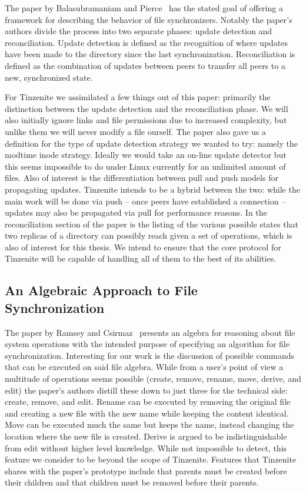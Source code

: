 The paper by Balasubramaniam and Pierce~\cite{balasubramaniam1998file} has the stated goal of offering a framework for describing the behavior of file synchronizers.
Notably the paper's authors divide the process into two separate phases: update detection and reconciliation.
Update detection is defined as the recognition of where updates have been made to the directory since the last synchronization.
Reconciliation is defined as the combination of updates between peers to transfer all peers to a new, synchronized state.

For Tinzenite we assimilated a few things out of this paper: primarily the distinction between the update detection and the reconciliation phase.
We will also initially ignore links and file permissions due to increased complexity, but unlike them we will never modify a file ourself.
The paper also gave us a definition for the type of update detection strategy we wanted to try: namely the modtime inode strategy.
Ideally we would take an on-line update detector but this seems impossible to do under Linux currently for an unlimited amount of files.
Also of interest is the differentiation between pull and push models for propagating updates.
Tinzenite intends to be a hybrid between the two: while the main work will be done via push -- once peers have established a connection -- updates may also be propagated via pull for performance reasons.
In the reconciliation section of the paper is the listing of the various possible states that two replicas of a directory can possibly reach given a set of operations, which is also of interest for this thesis.
We intend to ensure that the core protocol for Tinzenite will be capable of handling all of them to the best of its abilities.

\subsection{An Algebraic Approach to File Synchronization}
\label{sub:An Algebraic Approach to File Synchronization}

The paper by Ramsey and Csirmaz~\cite{ramsey2001algebraic} presents an algebra for reasoning about file system operations with the intended purpose of specifying an algorithm for file synchronization.
Interesting for our work is the discussion of possible commands that can be executed on said file algebra.
While from a user's point of view a multitude of operations seems possible (create, remove, rename, move, derive, and edit) the paper's authors distill these down to just three for the technical side: create, remove, and edit.
Rename can be executed by removing the original file and creating a new file with the new name while keeping the content identical.
Move can be executed much the same but keeps the name, instead changing the location where the new file is created.
Derive is argued to be indistinguishable from edit without higher level knowledge.
While not impossible to detect, this feature we consider to be beyond the scope of Tinzenite.
Features that Tinzenite shares with the paper's prototype include that parents must be created before their children and that children must be removed before their parents.

